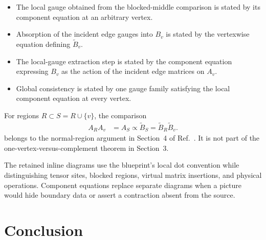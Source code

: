 \documentclass{article}
\begin{document}
\begin{itemize}
\item
The local gauge obtained from the blocked-middle comparison is stated by its
component equation at an arbitrary vertex.

\item
Absorption of the incident edge gauges into $B_v$ is stated by the vertexwise
equation defining $\widetilde B_v$.

\item
The local-gauge extraction step is stated by the component equation expressing
$B_v$ as the action of the incident edge matrices on $A_v$.

\item
Global consistency is stated by one gauge family satisfying the local
component equation at every vertex.
\end{itemize}

For regions $R\subset S=R\cup\{v\}$, the comparison
\begin{align}
    A_R A_v
        &= A_S
        \propto \widetilde B_S
        = \widetilde B_R\widetilde B_v.
    \label{eq:peps_injective_ft_section3_route_normal_region_comparison}
\end{align}
belongs to the normal-region argument in Section~4 of
Ref.~\cite{Molnar2018NormalPEPS}. It is not part of the
one-vertex-versus-complement theorem in Section~3.

The retained inline diagrams use the blueprint's local dot convention while
distinguishing tensor sites, blocked regions, virtual matrix insertions, and
physical operations. Component equations replace separate diagrams when a
picture would hide boundary data or assert a contraction absent from the
source.

\section{Conclusion}
\end{document}
